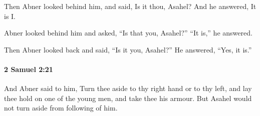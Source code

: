 			\begin{versebox}
					\item[BHS] 
					\item[ASV] Then Abner looked behind him, and said, Is it thou, Asahel? And he answered, It is I.
					\item[NIV] Abner looked behind him and asked, “Is that you, Asahel?” “It is,” he answered.
					\item[NRSV] Then Abner looked back and said, “Is it you, Asahel?” He answered, “Yes, it is.”
			\end{versebox}

		\paragraph{2 Samuel 2:21} %
			\label{2SAMUEL-2-21}

			And Abner said to him, Turn thee aside to thy right hand or to thy left, and lay thee hold on one of the young men, and take thee his armour. But Asahel would not turn aside from following of him.

